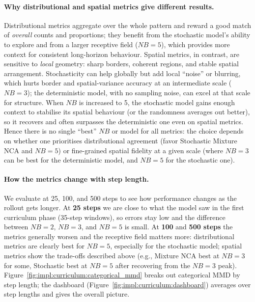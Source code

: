 \paragraph{Why distributional and spatial metrics give different results.}
Distributional metrics aggregate over the whole pattern and reward a good match of \emph{overall} counts and proportions; they benefit from the stochastic model's ability to explore and from a larger receptive field (\(NB=5\)), which provides more context for consistent long-horizon behaviour.
Spatial metrics, in contrast, are sensitive to \emph{local} geometry: sharp borders, coherent regions, and stable spatial arrangement.
Stochasticity can help globally but add local ``noise'' or blurring, which hurts border and spatial-variance accuracy at an intermediate scale (\(NB=3\)); the deterministic model, with no sampling noise, can excel at that scale for structure.
When \(NB\) is increased to 5, the stochastic model gains enough context to stabilise its spatial behaviour (or the randomness averages out better), so it recovers and often surpasses the deterministic one even on spatial metrics.
Hence there is no single ``best'' \(NB\) or model for all metrics: the choice depends on whether one prioritises distributional agreement (favor Stochastic Mixture NCA and \(NB=5\)) or fine-grained spatial fidelity at a given scale (where \(NB=3\) can be best for the deterministic model, and \(NB=5\) for the stochastic one).

\paragraph{How the metrics change with step length.}
We evaluate at 25, 100, and 500 steps to see how performance changes as the rollout gets longer.
At \textbf{25 steps} we are close to what the model saw in the first curriculum phase (35-step windows), so errors stay low and the difference between \(NB=2\), \(NB=3\), and \(NB=5\) is small.
At \textbf{100} and \textbf{500 steps} the metrics generally worsen and the receptive field matters more: distributional metrics are clearly best for \(NB=5\), especially for the stochastic model; spatial metrics show the trade-offs described above (e.g., Mixture NCA best at \(NB=3\) for some, Stochastic best at \(NB=5\) after recovering from the \(NB=3\) peak).
Figure~\ref{fig:impl:curriculum:categorical_mmd} breaks out categorical MMD by step length; the dashboard (Figure~\ref{fig:impl:curriculum:dashboard}) averages over step lengths and gives the overall picture.

